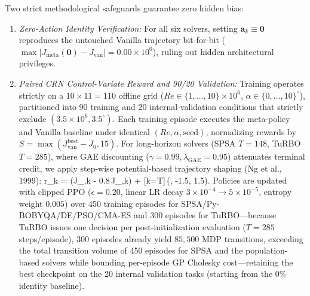 \documentclass[11pt,fleqn,letterpaper]{article}
\begin{document}
Two strict methodological safeguards guarantee zero hidden bias:
\begin{enumerate}
\setlength{\itemsep}{1pt}\setlength{\parskip}{0pt}\setlength{\topsep}{2pt}
\item \emph{Zero-Action Identity Verification:} For all six solvers, setting $\mathbf{a}_k \equiv \mathbf{0}$ reproduces the untouched Vanilla trajectory bit-for-bit ($\max|J_{\text{meta}}(\mathbf{0}) - J_{\text{van}}| = 0.00 \times 10^0$), ruling out hidden architectural privileges.
\item \emph{Paired CRN Control-Variate Reward and 90/20 Validation:} Training operates strictly on a $10 \times 11 = 110$ offline grid ($Re \in \{1,\dots,10\}\times 10^6$, $\alpha \in \{0,\dots,10\}^\circ$), partitioned into 90 training and 20 internal-validation conditions that strictly exclude $(3.5\times 10^6, 3.5^\circ)$. Each training episode executes the meta-policy and Vanilla baseline under identical $(Re, \alpha, \text{seed})$, normalizing rewards by $S = \max(J_{\text{van}}^{\text{best}} - J_0, 15)$. For long-horizon solvers (SPSA $T=148$, TuRBO $T=285$), where GAE discounting ($\gamma=0.99, \lambda_{\text{GAE}}=0.95$) attenuates terminal credit, we apply step-wise potential-based trajectory shaping (Ng et al., 1999):
\be
r_k = \bigl(\Delta J_{,k} - 0.8\,\Delta J_{,k}\bigr) + [k=T]\,\!\left(, -1.5, 1.5\right).
\label{eq:crn_reward}
\ee
Policies are updated with clipped PPO ($\epsilon=0.20$, linear LR decay $3\times 10^{-4} \to 5\times 10^{-5}$, entropy weight $0.005$) over 450 training episodes for SPSA/Py-BOBYQA/DE/PSO/CMA-ES and 300 episodes for TuRBO---because TuRBO issues one decision per post-initialization evaluation ($T=285$ steps/episode), 300 episodes already yield $85{,}500$ MDP transitions, exceeding the total transition volume of 450 episodes for SPSA and the population-based solvers while bounding per-episode GP Cholesky cost---retaining the best checkpoint on the 20 internal validation tasks (starting from the 0\% identity baseline).
\end{enumerate}
\end{document}
